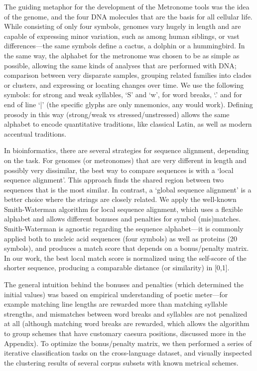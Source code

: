 \documentclass[
    hf
]{ceurart}
\begin{document}
The guiding metaphor for the development of the Metronome tools was the idea of the genome, and the four DNA molecules that are the basis for all cellular life. While consisting of only four symbols, genomes vary hugely in length and are capable of expressing minor variation, such as among human siblings, or vast differences---the same symbols define a cactus, a dolphin or a hummingbird. In the same way, the alphabet for the metronome was chosen to be as simple as possible, allowing the same kinds of analyses that are performed with DNA; comparison between very disparate samples, grouping related families into clades or clusters, and expressing or locating changes over time. We use the following symbols: for strong and weak syllables, `S' and `w', for word breaks, `.' and for end of line `|' (the specific glyphs are only mnemonics, any would work). Defining prosody in this way (strong/weak vs stressed/unstressed) allows the same alphabet to encode quantitative traditions, like classical Latin, as well as modern accentual traditions.

In bioinformatics, there are several  strategies for sequence alignment, depending on the task. For genomes (or metronomes) that are very different in length and possibly very dissimilar, the best way to compare sequences is with a `local sequence alignment'. This approach finds the shared region between two sequences that is the most similar. In contrast, a `global sequence alignment' is a better choice where the strings are closely related. We apply the well-known Smith-Waterman algorithm \cite{smith_identification_1981} for local sequence alignment, which uses a flexible alphabet and allows different bonuses and penalties for symbol (mis)matches. Smith-Waterman is agnostic regarding the sequence alphabet---it is commonly applied both to nucleic acid sequences (four symbols) as well as proteins (20 symbols), and produces a match score that depends on a bonus/penalty matrix. In our work, the best local match score is normalized using the self-score of the shorter sequence, producing a comparable distance (or similarity) in [0,1].

The general intuition behind the bonuses and penalties (which determined the initial values) was based on empirical understanding of poetic meter---for example matching line lengths are rewarded more than matching syllable strengths, and mismatches between word breaks and syllables are not penalized at all (although matching word breaks are rewarded, which allows the algorithm to group schemes that have customary caesura positions, discussed more in the Appendix). To optimize the bonus/penalty matrix, we then performed a series of iterative classification tasks on the cross-language dataset, and visually inspected the clustering results of several corpus subsets with known metrical schemes.
\end{document}
